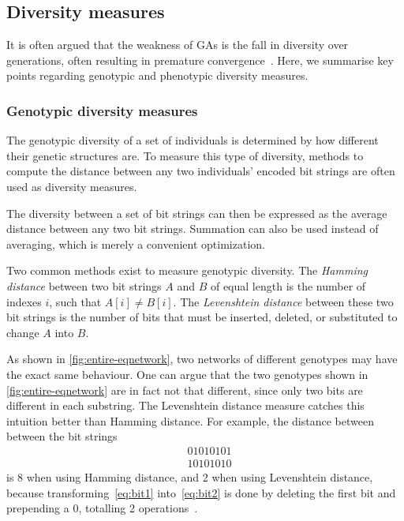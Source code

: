 \subsection{Diversity measures}
\label{sec:diversitymeasures}
It is often argued that the weakness of GAs is the fall in diversity over generations, often resulting in premature convergence~\cite{diaz2007empirical, 1266373,Zitzler00comparisonof}. Here, we summarise key points regarding genotypic and phenotypic diversity measures. %

\subsubsection{Genotypic diversity measures}
The genotypic diversity of a set of individuals is determined by how different their genetic structures are. To measure this type of diversity, methods to compute the distance between any two individuals' encoded bit strings are often used as diversity measures.

The diversity between a set of bit strings can then be expressed as the average distance between any two bit strings. Summation can also be used instead of averaging, which is merely a convenient optimization.

Two common methods exist to measure genotypic diversity. The \emph{Hamming distance} between two bit strings $A$ and $B$ of equal length is the number of indexes $i$, such that $A[i] \neq B[i]$. The \emph{Levenshtein distance} between these two bit strings is the number of bits that must be inserted, deleted, or substituted to change $A$ into $B$.

As shown in \cref{fig:entire-eqnetwork}, two networks of different genotypes may have the exact same behaviour. One can argue that the two genotypes shown in \cref{fig:entire-eqnetwork} are in fact not that different, since only two bits are different in each substring. The Levenshtein distance measure catches this intuition better than Hamming distance. For example, the distance between between the bit strings
%
\begin{align}
  &01010101\label{eq:bit1} \\
  &10101010\label{eq:bit2}
\end{align}
%
is 8 when using Hamming distance, and 2 when using Levenshtein distance, because transforming~\ref{eq:bit1} into~\ref{eq:bit2} is done by deleting the first bit and prepending a $0$, totalling 2 operations~\cite{1250187}.


